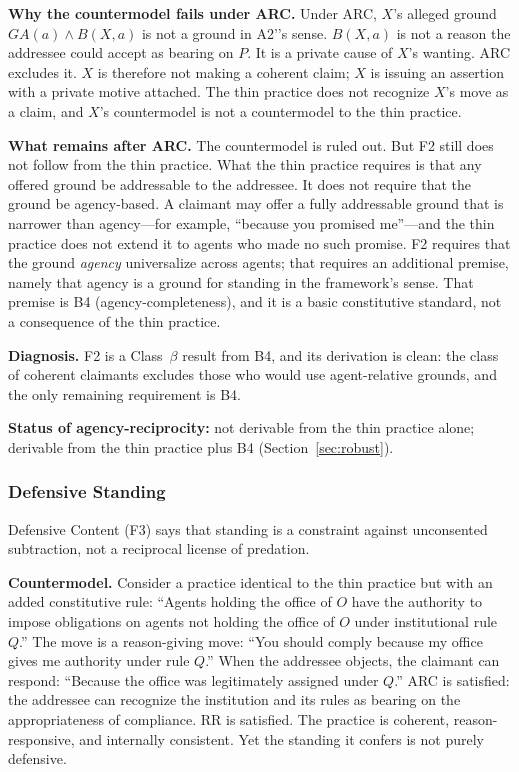 \documentclass[11pt]{article}
\def\ensuremath#1{#1}%
\def\mathrm#1{#1}%
\newcommand{\Atwo}{\texorpdfstring{\ensuremath{\mathrm{A2}'}}{A2'}}
\newcommand{\cb}{\texorpdfstring{Class~$\beta$}{Class beta}}
\begin{document}
\textbf{Why the countermodel fails under ARC.} Under ARC, $X$'s alleged ground $GA(a) \land B(X, a)$ is not a ground in \Atwo{}'s sense. $B(X, a)$ is not a reason the addressee could accept as bearing on $P$. It is a private cause of $X$'s wanting. ARC excludes it. $X$ is therefore not making a coherent claim; $X$ is issuing an assertion with a private motive attached. The thin practice does not recognize $X$'s move as a claim, and $X$'s countermodel is not a countermodel to the thin practice.

\textbf{What remains after ARC.} The countermodel is ruled out. But F2 still does not follow from the thin practice. What the thin practice requires is that any offered ground be addressable to the addressee. It does not require that the ground be agency-based. A claimant may offer a fully addressable ground that is narrower than agency---for example, ``because you promised me''---and the thin practice does not extend it to agents who made no such promise. F2 requires that the ground \emph{agency} universalize across agents; that requires an additional premise, namely that agency is a ground for standing in the framework's sense. That premise is B4 (agency-completeness), and it is a basic constitutive standard, not a consequence of the thin practice.

\textbf{Diagnosis.} F2 is a \cb{} result from B4, and its derivation is clean: the class of coherent claimants excludes those who would use agent-relative grounds, and the only remaining requirement is B4.

\textbf{Status of agency-reciprocity:} not derivable from the thin practice alone; derivable from the thin practice plus B4 (Section~\ref{sec:robust}).

\subsubsection{Defensive Standing}
Defensive Content (F3) says that standing is a constraint against unconsented subtraction, not a reciprocal license of predation.

\textbf{Countermodel.} Consider a practice identical to the thin practice but with an added constitutive rule: ``Agents holding the office of $O$ have the authority to impose obligations on agents not holding the office of $O$ under institutional rule $Q$.'' The move is a reason-giving move: ``You should comply because my office gives me authority under rule $Q$.'' When the addressee objects, the claimant can respond: ``Because the office was legitimately assigned under $Q$.'' ARC is satisfied: the addressee can recognize the institution and its rules as bearing on the appropriateness of compliance. RR is satisfied. The practice is coherent, reason-responsive, and internally consistent. Yet the standing it confers is not purely defensive.
\end{document}
